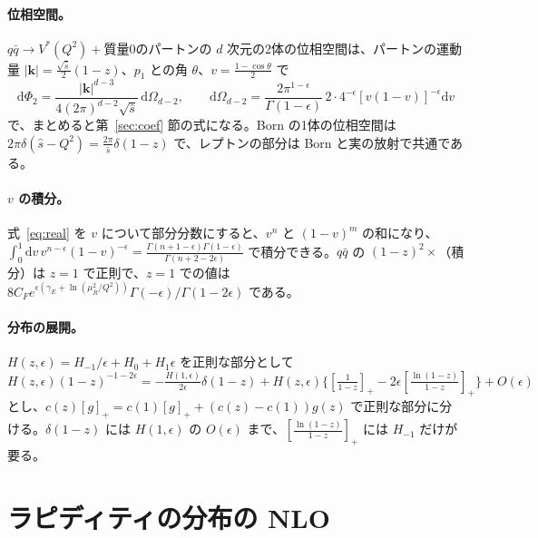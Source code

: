\documentclass[a4paper,10pt]{ltjsarticle}
\newcommand{\dd}{\mathrm{d}}
\begin{document}
\paragraph{位相空間。}$q\bar q\to V^*(Q^2)+$質量0のパートンの $d$ 次元の2体の位相空間は、パートンの運動量 $|\boldsymbol k|=\frac{\sqrt{\hat s}}2(1-z)$、$p_1$ との角 $\theta$、$v=\frac{1-\cos\theta}2$ で
\[
\dd\Phi_2=\frac{|\boldsymbol k|^{d-3}}{4(2\pi)^{d-2}\sqrt{\hat s}}\,\dd\Omega_{d-2},\qquad
\dd\Omega_{d-2}=\frac{2\pi^{1-\epsilon}}{\Gamma(1-\epsilon)}\,2\cdot4^{-\epsilon}[v(1-v)]^{-\epsilon}\dd v
\]
で、まとめると第~\ref{sec:coef} 節の式になる。Born の1体の位相空間は $2\pi\delta(\hat s-Q^2)=\frac{2\pi}{\hat s}\delta(1-z)$ で、レプトンの部分は Born と実の放射で共通である。

\paragraph{$v$ の積分。}式~\eqref{eq:real} を $v$ について部分分数にすると、$v^n$ と $(1-v)^m$ の和になり、$\int_0^1\dd v\,v^{n-\epsilon}(1-v)^{-\epsilon}=\frac{\Gamma(n+1-\epsilon)\Gamma(1-\epsilon)}{\Gamma(n+2-2\epsilon)}$ で積分できる。$q\bar q$ の $(1-z)^2\times$（積分）は $z=1$ で正則で、$z=1$ での値は $8C_Fe^{\epsilon(\gamma_E+\ln(\mu_R^2/Q^2))}\Gamma(-\epsilon)/\Gamma(1-2\epsilon)$ である。

\paragraph{分布の展開。}$H(z,\epsilon)=H_{-1}/\epsilon+H_0+H_1\epsilon$ を正則な部分として $H(z,\epsilon)(1-z)^{-1-2\epsilon}=-\frac{H(1,\epsilon)}{2\epsilon}\delta(1-z)+H(z,\epsilon)\{[\frac1{1-z}]_+-2\epsilon[\frac{\ln(1-z)}{1-z}]_+\}+O(\epsilon)$ とし、$c(z)[g]_+=c(1)[g]_++(c(z)-c(1))g(z)$ で正則な部分に分ける。$\delta(1-z)$ には $H(1,\epsilon)$ の $O(\epsilon)$ まで、$[\frac{\ln(1-z)}{1-z}]_+$ には $H_{-1}$ だけが要る。

\section{ラピディティの分布の NLO}\label{app:rap}
\end{document}

